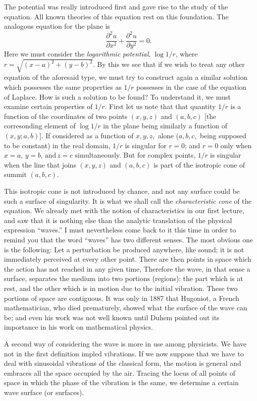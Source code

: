 \documentclass[12pt,oneside]{book}
\begin{document}
The potential was really introduced first and gave rise to the study of the equation. All known theories of this equation rest on  this foundation. The analogous equation for the plane is
$$\frac{\partial^2u}{\partial x^2}+\frac{\partial^2 u}{\partial y^2}=0.$$
Here we must consider the \textit{logarithmic potential}, $\log 1/r$, where $r=\sqrt{(x-a)^2+(y-b)^2}$. By this we see that if we wish to treat any other equation of the aforesaid type, we must try to construct again a similar solution which possesses the same properties as $1/r$ possesses in the case of the equation of Laplace. How is such a solution to be found? To understand it, we must examine certain properties of $1/r$. First let us note that that quantity $1/r$ is a function of the coordinates of two points $(x,y,z)$ and $(a,b,c)$ [the corresonding element of $\log 1/r$ in the plane being similarly a function of $(x,y;a,b)$]. If considered as a function of $x,y,z,$ alone ($a,b,c,$ being supposed to be constant) in the real domain, $1/r$ is singular for $r=0$; and $r=0$ only when $x=a,\, y=b,\,\text{and}\, z=c$ simultaneously. But for complex points, $1/r$ is singular when the line that joins $(x,y,z)$ and $(a,b,c)$ is part of the isotropic cone of summit $(a,b,c)$. \par

This isotropic cone is not introduced by chance, and not any surface could be such a surface of singularity. It is what we shall call the \textit{characteristic cone} of the equation. We already met with the notion of characteristics in our first lecture, and saw that it is nothing else than the analytic translation of the physical expression ``waves.'' I must nevertheless come back to it this time in order to remind you that the word ``waves'' has two different senses. The most obvious one is the following: Let a perturbation be produced anywhere, like sound; it is not immediately perceived at every other point. There are then points in space which the action has not reached in any given time, Therefore the wave, in that sense a surface, separates the medium into two portions (regions): the part which is at rest, and the other which is in motion due to the initial vibration. These two portions of space are contiguous. It was only in 1887 that Hugoniot, a French mathematician, who died prematurely, showed what the surface of the wave can be; and even his work was not well known until Duhem pointed out its importance in his work on mathematical physics. \par

A second way of considering the wave is more in use among physicists. We have not in the first definition impled vibrations. If we now suppose that we have to deal with sinusoidal vibrations of the classical form, the motion is general and embraces all the space occupied by the air. Tracing the locus of all points of space in which the phase of the vibration is the same, we determine a certain wave surface (or surfaces). \par
\end{document}
